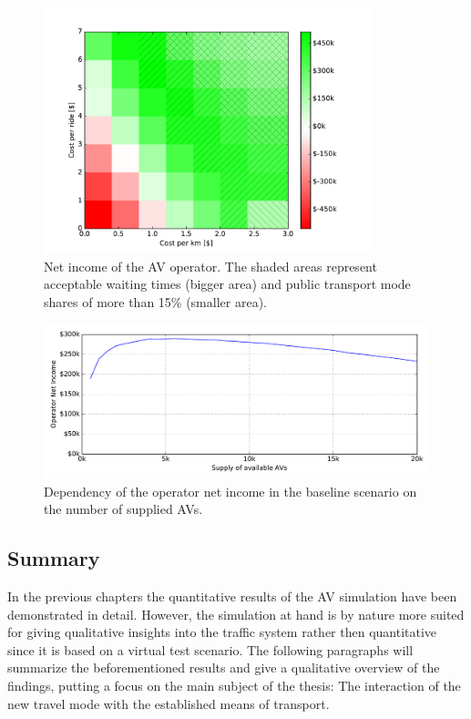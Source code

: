 \begin{figure}
    \centering
    \includegraphics[width=0.85\textwidth]{figures/netincomegrid.pdf}
    \caption{Net income of the AV operator. The shaded areas represent acceptable
    waiting times (bigger area) and public transport mode shares of more than
    15\% (smaller area).}
    \label{fig:netincomegrid}
\end{figure}

\begin{figure}
    \centering
    \includegraphics[width=1.0\textwidth]{figures/revenuesupply.pdf}
    \caption{Dependency of the operator net income in the baseline scenario on
    the number of supplied AVs.}
    \label{fig:revenuesupply}
\end{figure}

\subsection{Summary}

In the previous chapters the quantitative results of the AV simulation have been
demonstrated in detail. However, the simulation at hand is by nature more suited
for giving qualitative insights into the traffic system rather then quantitative
since it is based on a virtual test scenario. The following paragraphs will
summarize the beforementioned results and give a qualitative overview of the
findings, putting a focus on the main subject of the thesis: The interaction of
the new travel mode with the established means of transport.

